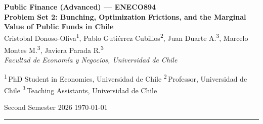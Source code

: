 \documentclass[11pt,a4paper, twoside]{article}
\begin{document}
\begin{center}
    {\large \textbf{Public Finance (Advanced) --- ENECO894}}\\[4pt]
    {\Large \textbf{Problem Set 2: Bunching, Optimization Frictions, and the Marginal Value of Public Funds in Chile}}\\[10pt]
    {\normalsize
        Cristobal Donoso-Oliva\textsuperscript{1},
        Pablo Guti\'errez Cubillos\textsuperscript{2},
        Juan Duarte A.\textsuperscript{3},
        Marcelo Montes M.\textsuperscript{3},
        Javiera Parada R.\textsuperscript{3}
    }\\[6pt]
    {\small \textit{Facultad de Econom\'ia y Negocios, Universidad de Chile}}\\[8pt]
    \begin{minipage}{0.95\textwidth}
        \raggedright
        \footnotesize
        \textsuperscript{1}\,PhD Student in Economics, Universidad de Chile \quad
        \textsuperscript{2}\,Professor, Universidad de Chile \quad
        \textsuperscript{3}\,Teaching Assistants, Universidad de Chile
    \end{minipage}
\end{center}
\vspace{-0.4em}
\begin{flushright}
    \small Second Semester 2026 \;\textbar\; \today
\end{flushright}
\vspace{-0.6em}
\hrule
\vspace{1.2em}
\end{document}
